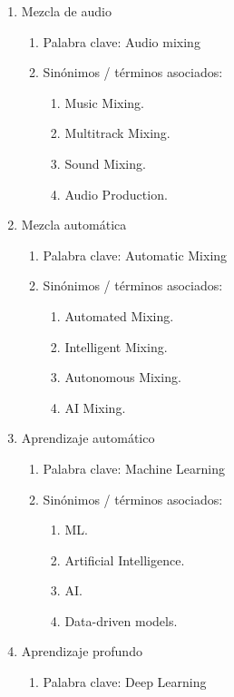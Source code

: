 \documentclass[12pt]{article}
\begin{document}
\begin{enumerate}
    \item Mezcla de audio
    \begin{enumerate}
        \item Palabra clave: Audio mixing
        \item Sinónimos / términos asociados:
        \begin{enumerate}[label=\roman*)]
            \item Music Mixing.
            \item Multitrack Mixing.
            \item Sound Mixing.
            \item Audio Production.
        \end{enumerate}
    \end{enumerate}
    \item Mezcla automática
    \begin{enumerate}
        \item Palabra clave: Automatic Mixing
        \item Sinónimos / términos asociados:
        \begin{enumerate}[label=\roman*)]
            \item Automated Mixing.
            \item Intelligent Mixing.
            \item Autonomous Mixing.
            \item AI Mixing.
        \end{enumerate}
    \end{enumerate}
    \item Aprendizaje automático
    \begin{enumerate}
        \item Palabra clave: Machine Learning
        \item Sinónimos / términos asociados:
        \begin{enumerate}[label=\roman*)]
            \item ML.
            \item Artificial Intelligence.
            \item AI.
            \item Data-driven models.
        \end{enumerate}
    \end{enumerate}
    \item Aprendizaje profundo
    \begin{enumerate}
        \item Palabra clave: Deep Learning

\end{enumerate}
\end{enumerate}
\end{document}
